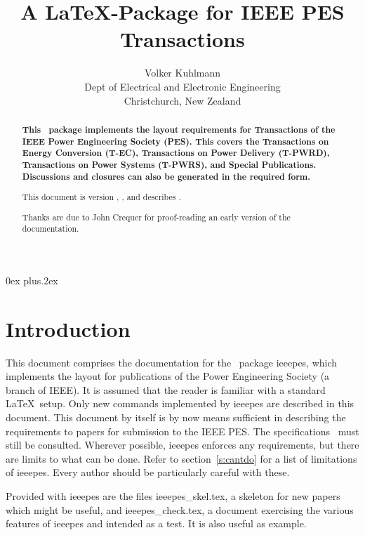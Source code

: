 \documentclass[twoside,twocolumn,a4paper]{article}
\title{A \LaTeX-Package for IEEE PES Transactions}
\author{
	Volker Kuhlmann\\
	Dept of Electrical and Electronic Engineering\\
	Christchurch, New Zealand
}
\begin{document}
\def\today{\Filedate}
\newcommand\file{\textsf}
\newcommand\ag{\textsc}



\maketitle

{
\parskip	0ex plus.2ex
\tableofcontents
\par
}


\begin{abstract}
\bfseries
This \LaTeXe\ package implements the layout requirements for
Transactions of the IEEE Power Engineering Society (PES). This covers
the Transactions on Energy Conversion (T-EC), Transactions on Power
Delivery (T-PWRD), Transactions on Power Systems (T-PWRS), and Special
Publications. Discussions and closures can also be generated in the
required form.

This document is version \Fileversion, \Filedate, and describes
\Packageversion.

Thanks are due to John Crequer for proof-reading an early version of the
documentation.
\end{abstract}



\section{Introduction}

This document comprises the documentation for the \LaTeXe\ package ieeepes,
which implements the layout for publications of the Power Engineering Society
(a branch of IEEE). It is assumed that the reader is familiar with a standard
\LaTeX\ setup. Only new commands implemented by ieeepes are described in this
document. This document by itself is by now means sufficient in describing the
requirements to papers for submission to the IEEE PES. The
specifications~\cite{IEEEPES_PaperPreparation} must still be consulted.
Wherever possible, ieeepes enforces any requirements, but there are limits to
what can be done. Refer to section~\ref{s:cantdo} for a list of limitations of
ieeepes. Every author should be particularly careful with these.

Provided with ieeepes are the files \file{ieeepes\_skel.tex}, a skeleton for
new papers which might be useful, and \file{ieeepes\_check.tex}, a document
exercising the various features of ieeepes and intended as a test. It is also
useful as example.
\end{document}
